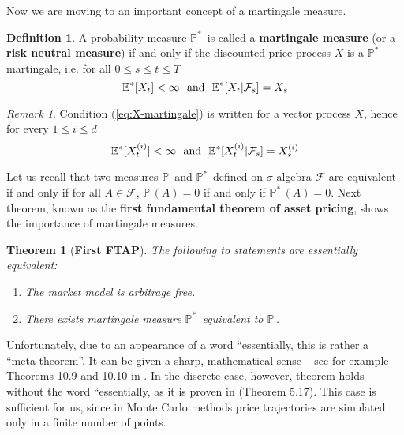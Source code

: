\documentclass[a4paper,11pt, twoside]{book}
\newtheorem{thm}{Theorem}[chapter]
\theoremstyle{definition}
\newtheorem{mydef}{Definition}[chapter]
\theoremstyle{remark}
\newtheorem{remark}{Remark}[chapter]
\newcounter{example}[chapter]
\def\P{{\mathbb{P}}\,}
\def\Em{{\mathbb{E}^*}}
\def\Pm{{\mathbb{P}}^*\,}
\begin{document}
Now we are moving to an important concept of a martingale measure.
\begin{mydef}
 A probability measure $\Pm$ is called a \textbf{martingale measure} (or a \textbf{risk neutral measure}) if and only if the discounted price process $X$ is a $\Pm$-martingale, i.e. for all  $0 \leq s \leq t \leq T$
 \begin{equation}
  \label{eq:X-martingale}
  \Em[X_t] < \infty \hbox{\ \ and\ \ } \Em[X_t | \mathcal{F}_s] = X_s
 \end{equation}
\end{mydef}

\begin{remark}
 Condition (\ref{eq:X-martingale}) is written for a vector process $X$, hence for every $1 \leq i \leq d$
  \begin{equation*}
  \Em[X^{(i)}_t] < \infty \hbox{\ \ and\ \ } \Em[X^{(i)}_t | \mathcal{F}_s] = X^{(i)}_s
 \end{equation*}
\end{remark}

Let us recall that two measures $\P$ and $\Pm$ defined on $\sigma$-algebra $\mathcal{F}$ are equivalent if and only if for all $A \in \mathcal{F}$, $\P(A)=0$ if and only if $\Pm(A)=0$. Next theorem, known as the \textbf{first fundamental theorem of asset pricing}, shows the importance of martingale measures.
\begin{thm}[\bfseries First FTAP]
 \label{thm:fftap}
 The following to statements are \emph{essentially} equivalent:
 \begin{enumerate}
  \item The market model is arbitrage free.
  \item There exists martingale measure $\Pm$ equivalent to $\P$.
 \end{enumerate}
\end{thm}
Unfortunately, due to an appearance of a word ``essentially, this is rather a ``meta-theorem''. It can be given a sharp, mathematical sense -- see for example Theorems 10.9 and 10.10 in \cite{bjork}. In the discrete case, however, theorem holds without the word ``essentially, as it is proven in \cite{follmer} (Theorem 5.17). This case is sufficient for us, since in Monte Carlo methods price trajectories are simulated only in a finite number of points.
\end{document}
